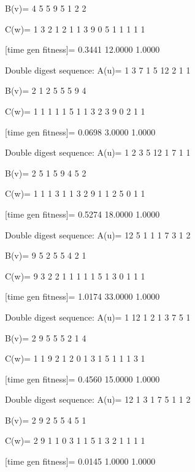 B(v)=
     4     5     5     9     5     1     2     2

C(w)=
     1     3     2     1     2     1     1     3     9     0     5     1     1     1     1     1

[time gen fitness]=
    0.3441   12.0000    1.0000

Double digest sequence:
A(u)=
     1     3     7     1     5    12     2     1     1

B(v)=
     2     1     2     5     5     5     9     4

C(w)=
     1     1     1     1     1     5     1     1     3     2     3     9     0     2     1     1

[time gen fitness]=
    0.0698    3.0000    1.0000

Double digest sequence:
A(u)=
     1     2     3     5    12     1     7     1     1

B(v)=
     2     5     1     5     9     4     5     2

C(w)=
     1     1     1     3     1     1     3     2     9     1     1     2     5     0     1     1

[time gen fitness]=
    0.5274   18.0000    1.0000

Double digest sequence:
A(u)=
    12     5     1     1     1     7     3     1     2

B(v)=
     9     5     2     5     5     4     2     1

C(w)=
     9     3     2     2     1     1     1     1     1     5     1     3     0     1     1     1

[time gen fitness]=
    1.0174   33.0000    1.0000

Double digest sequence:
A(u)=
     1    12     1     2     1     3     7     5     1

B(v)=
     2     9     5     5     5     2     1     4

C(w)=
     1     1     9     2     1     2     0     1     3     1     5     1     1     1     3     1

[time gen fitness]=
    0.4560   15.0000    1.0000

Double digest sequence:
A(u)=
    12     1     3     1     7     5     1     1     2

B(v)=
     2     9     2     5     5     4     5     1

C(w)=
     2     9     1     1     0     3     1     1     5     1     3     2     1     1     1     1

[time gen fitness]=
    0.0145    1.0000    1.0000

